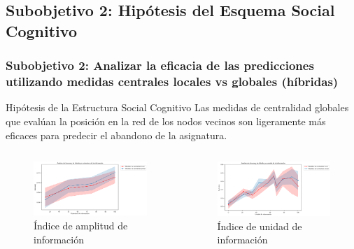 \documentclass{beamer}
\begin{document}
\subsection{Subobjetivo 2: Hipótesis del Esquema Social Cognitivo}
\begin{frame}
	\frametitle{Subobjetivo 2: Analizar la eficacia de las predicciones utilizando medidas centrales  locales vs globales (híbridas)}
\begin{block}{Hipótesis de la Estructura Social Cognitivo }
    Las medidas de centralidad globales que evalúan la posición en la red de los nodos vecinos son ligeramente más eficaces para predecir el abandono de la asignatura.
	\end{block}

		\begin{columns}[c]
	\begin{column}{.5\textwidth}
		\begin{figure}
			\centering
			\includegraphics[width=1\textwidth]{figs/cap7/figura_43}
\caption{Índice de amplitud de información}
		\end{figure}      
	\end{column}
	\begin{column}{.5\textwidth}
		\begin{figure}
			\centering
				\includegraphics[width=1\textwidth]{figs/cap7/figura_44}
\caption{Índice de unidad de información}
		\end{figure}
	\end{column}
\end{columns}

\end{frame}
\end{document}

